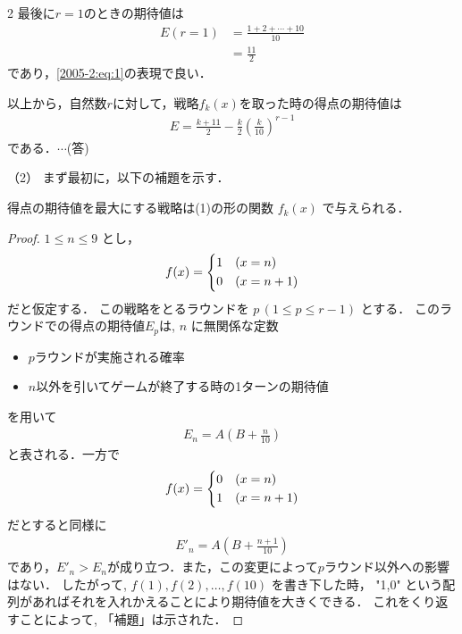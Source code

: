 \documentclass[../../../../main.tex]{subfiles}
\begin{document}
\begin{multicols}{2}
  最後に$r=1$のときの期待値は
  \begin{align*}
    E(r=1)
     & = \frac{1+2+\cdots + 10}{10} \\
     & =\frac{11}{2}
  \end{align*}
  であり，\cref{2005-2:eq:1}の表現で良い．

  以上から，自然数$r$に対して，戦略$f_k(x)$を取った時の得点の期待値は
  \begin{align*}
    E = \frac{k+11}{2} - \frac{k}{2} \left(\frac{k}{10}\right)^{r-1}
  \end{align*}
  である．$\cdots$(答)
  \vspace{10pt}


  （2）
  まず最初に，以下の補題を示す．

  \begin{lemma}
    得点の期待値を最大にする戦略は(1)の形の関数 $f_{k}(x)$ で与えられる．
  \end{lemma}

  \begin{proof}
    $1 \le n \le 9$ とし，
    \begin{align*}
      f(x)=
      \begin{dcases}
        1 & (x=n)   \\
        0 & (x=n+1)
      \end{dcases}
    \end{align*}
    だと仮定する．
    この戦略をとるラウンドを $p\, (1 \le p \le r-1)$ とする．
    このラウンドでの得点の期待値$E_p$は, $n$ に無関係な定数
    \begin{itemize}
      \item[$A$] $p$ラウンドが実施される確率
      \item[$B$] $n$以外を引いてゲームが終了する時の1ターンの期待値
    \end{itemize}
    を用いて
    \begin{align*}
      E_n = A\left(B+\frac{n}{10}\right)
    \end{align*}
    と表される．一方で
    \begin{align*}
      f(x)=
      \begin{dcases}
        0 & (x=n)   \\
        1 & (x=n+1)
      \end{dcases}
    \end{align*}
    だとすると同様に
    \begin{align*}
      E'_n = A\left(B+\frac{n+1}{10}\right)
    \end{align*}
    であり，$E'_n>E_n$が成り立つ．また，この変更によって$p$ラウンド以外への影響はない．
    したがって, $f(1), f(2), \dots, f(10)$ を書き下した時， "1,0" という配列があればそれを入れかえることにより期待値を大きくできる．
    これをくり返すことによって, 「補題」は示された．
  \end{proof}


\end{multicols}
\end{document}
